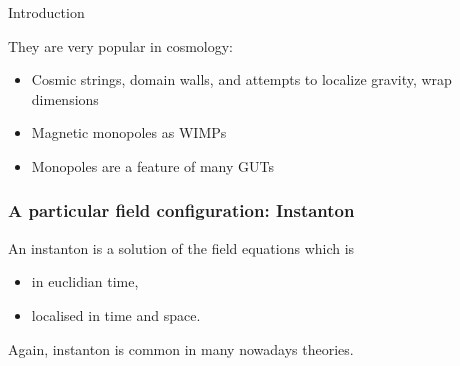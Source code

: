 \begin{section}{Introduction}
\begin{frame}
      They are very popular in cosmology:
      \begin{itemize}
      \item Cosmic strings, domain walls, and attempts to localize gravity, wrap dimensions
      \item Magnetic monopoles as WIMPs
      \item Monopoles are a feature of many GUTs
      \end{itemize}
    \end{frame}

    \begin{frame}
      \frametitle{A particular field configuration: Instanton}
      An instanton is a solution of the field equations which is
      \begin{itemize}
      \item in euclidian time,
      \item localised in time and space.
      \end{itemize}
      Again, instanton is common in many nowadays theories.
    \end{frame}

\end{section}

